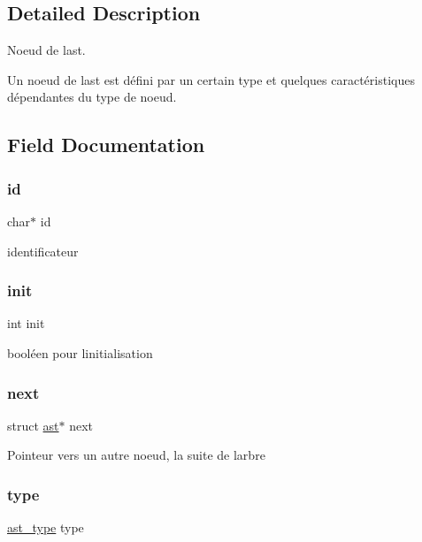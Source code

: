 \subsection{Detailed Description}
Noeud de l\textquotesingle{}ast. 

Un noeud de l\textquotesingle{}ast est défini par un certain type et quelques caractéristiques dépendantes du type de noeud. 

\subsection{Field Documentation}
\mbox{\label{structast_aecb3b0d045ada529257a2fbf8f829599}} 
\subsubsection{\texorpdfstring{id}{id}}
{\footnotesize\ttfamily char$\ast$ id}

identificateur \mbox{\label{structast_a795ea50921b36311ffd5e7baa2ef1f7e}} 
\subsubsection{\texorpdfstring{init}{init}}
{\footnotesize\ttfamily int init}

booléen pour l\textquotesingle{}initialisation \mbox{\label{structast_ae48f04f7acec87ecf7f0bc953cb56bf4}} 
\subsubsection{\texorpdfstring{next}{next}}
{\footnotesize\ttfamily struct \hyperlink{structast}{ast}$\ast$ next}

Pointeur vers un autre noeud, la suite de l\textquotesingle{}arbre \mbox{\label{structast_a8321fc8e556a418583dd74ee9fcc2bf7}} 
\subsubsection{\texorpdfstring{type}{type}}
{\footnotesize\ttfamily \hyperlink{ast_8h_a77091c187ac9a89404fac2e8226daef3}{ast\+\_\+type} type}

